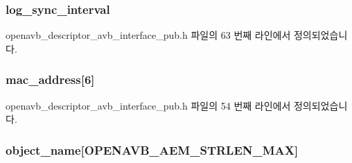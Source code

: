 \subsubsection[{\texorpdfstring{log\+\_\+sync\+\_\+interval}{log_sync_interval}}]{ log\+\_\+sync\+\_\+interval}\hypertarget{structopenavb__aem__descriptor__avb__interface__t_a9d775a7830d6374c958e5310b6881d3b}{}\label{structopenavb__aem__descriptor__avb__interface__t_a9d775a7830d6374c958e5310b6881d3b}


openavb\+\_\+descriptor\+\_\+avb\+\_\+interface\+\_\+pub.\+h 파일의 63 번째 라인에서 정의되었습니다.

\subsubsection[{\texorpdfstring{mac\+\_\+address}{mac_address}}]{ mac\+\_\+address\mbox{[}6\mbox{]}}\hypertarget{structopenavb__aem__descriptor__avb__interface__t_ae89cba1786fd99df25dbf48f24ccb50f}{}\label{structopenavb__aem__descriptor__avb__interface__t_ae89cba1786fd99df25dbf48f24ccb50f}


openavb\+\_\+descriptor\+\_\+avb\+\_\+interface\+\_\+pub.\+h 파일의 54 번째 라인에서 정의되었습니다.

\subsubsection[{\texorpdfstring{object\+\_\+name}{object_name}}]{ object\+\_\+name\mbox{[}{\bf O\+P\+E\+N\+A\+V\+B\+\_\+\+A\+E\+M\+\_\+\+S\+T\+R\+L\+E\+N\+\_\+\+M\+AX}\mbox{]}}\hypertarget{structopenavb__aem__descriptor__avb__interface__t_a5e98aba8105a7a6d82fac41816c83da3}{}\label{structopenavb__aem__descriptor__avb__interface__t_a5e98aba8105a7a6d82fac41816c83da3}



